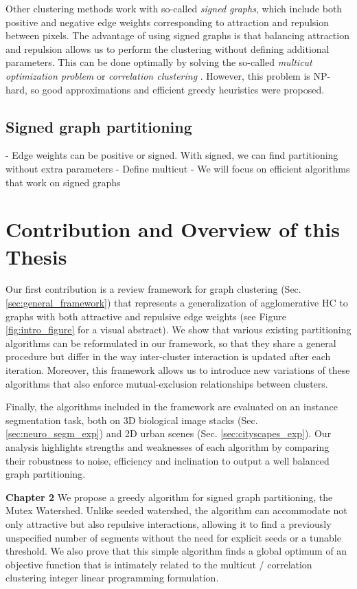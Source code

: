 Other clustering methods work with so-called \emph{signed graphs}, which include both positive and negative edge weights corresponding to attraction and repulsion between pixels. The advantage of using signed graphs is that balancing attraction and repulsion allows us to perform the clustering without defining additional parameters. This can be done optimally by solving the so-called \emph{multicut optimization problem} or \emph{correlation clustering} \cite{kappes2011globally,chopra1991multiway}. However, this problem is NP-hard, so good approximations \cite{yarkony2012fast,pape2017solving} and efficient greedy heuristics \cite{levinkov2017comparative,wolf2018mutex} were proposed.



\subsection{Signed graph partitioning}
- Edge weights can be positive or signed. With signed, we can find partitioning without extra parameters
- Define multicut
- We will focus on efficient algorithms that work on signed graphs


\section{Contribution and Overview of this Thesis}

Our first contribution is a review framework for graph clustering (Sec. \ref{sec:general_framework}) that represents a generalization of agglomerative HC to graphs with both attractive and repulsive edge weights (see Figure \ref{fig:intro_figure} for a visual abstract). 
We show that various existing partitioning algorithms \cite{levinkov2017comparative,wolf2018mutex,kardoostsolving,lance1967general} can be reformulated in our framework, so that they share a general procedure but differ in the way inter-cluster interaction is updated after each iteration. Moreover, this framework allows us to introduce new variations of these algorithms that also enforce mutual-exclusion relationships between clusters.  

Finally, the algorithms included in the framework are evaluated on an instance segmentation task, both on 3D biological image stacks (Sec. \ref{sec:neuro_segm_exp}) and 2D urban scenes (Sec. \ref{sec:cityscapes_exp}). Our analysis highlights strengths and weaknesses of each algorithm by comparing their robustness to noise, efficiency and inclination to output a well balanced graph partitioning.

\textbf{Chapter 2}
We propose a greedy algorithm for signed graph partitioning, the Mutex Watershed. Unlike seeded watershed, the algorithm can accommodate not only attractive but also repulsive interactions, allowing it to ﬁnd a previously unspeciﬁed number of segments without the need for explicit seeds or a tunable threshold. We also prove that this simple algorithm ﬁnds a global optimum of an objective function that is intimately related to the multicut / correlation clustering integer linear programming formulation.

